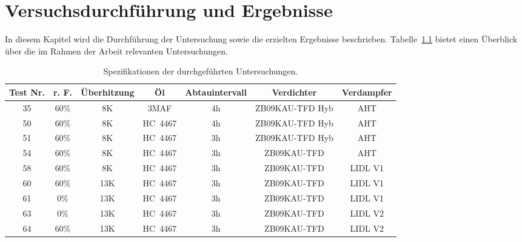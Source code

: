 
\chapter{Versuchsdurchführung und Ergebnisse}
\label{cha:Versuchsdurchführung}

In diesem Kapitel wird die Durchführung der Untersuchung sowie die erzielten Ergebnisse beschrieben. Tabelle~\ref{tab:alltests} bietet einen Überblick über die im Rahmen der Arbeit relevanten Untersuchungen.

\begin{table}[h!]
\centering
\caption{Spezifikationen der durchgeführten Untersuchungen.}
\label{tab:alltests}
\begin{tabular}{|ccccccc|}
\hline
Test Nr.              & r. F.                     & Überhitzung              & Öl                               & Abtauintervall          & Verdichter                           & Verdampfer \\ \hline
\multicolumn{1}{|c|}{35} & \multicolumn{1}{c|}{60\%} & \multicolumn{1}{c|}{8K}  & \multicolumn{1}{c|}{3MAF}        & \multicolumn{1}{c|}{4h} & \multicolumn{1}{c|}{ZB09KAU-TFD Hyb} & AHT        \\
\multicolumn{1}{|c|}{50} & \multicolumn{1}{c|}{60\%} & \multicolumn{1}{c|}{8K}  & \multicolumn{1}{c|}{HC~4467} & \multicolumn{1}{c|}{4h} & \multicolumn{1}{c|}{ZB09KAU-TFD Hyb} & AHT        \\
\multicolumn{1}{|c|}{51} & \multicolumn{1}{c|}{60\%} & \multicolumn{1}{c|}{8K}  & \multicolumn{1}{c|}{HC~4467} & \multicolumn{1}{c|}{3h} & \multicolumn{1}{c|}{ZB09KAU-TFD Hyb} & AHT        \\
\multicolumn{1}{|c|}{54} & \multicolumn{1}{c|}{60\%} & \multicolumn{1}{c|}{8K}  & \multicolumn{1}{c|}{HC~4467} & \multicolumn{1}{c|}{3h} & \multicolumn{1}{c|}{ZB09KAU-TFD}     & AHT        \\
\multicolumn{1}{|c|}{58} & \multicolumn{1}{c|}{60\%} & \multicolumn{1}{c|}{8K}  & \multicolumn{1}{c|}{HC~4467} & \multicolumn{1}{c|}{3h} & \multicolumn{1}{c|}{ZB09KAU-TFD}     & LIDL V1    \\
\multicolumn{1}{|c|}{60} & \multicolumn{1}{c|}{60\%} & \multicolumn{1}{c|}{13K} & \multicolumn{1}{c|}{HC~4467} & \multicolumn{1}{c|}{3h} & \multicolumn{1}{c|}{ZB09KAU-TFD}     & LIDL V1    \\
\multicolumn{1}{|c|}{61} & \multicolumn{1}{c|}{0\%}  & \multicolumn{1}{c|}{13K} & \multicolumn{1}{c|}{HC~4467} & \multicolumn{1}{c|}{3h} & \multicolumn{1}{c|}{ZB09KAU-TFD}     & LIDL V1    \\
\multicolumn{1}{|c|}{63} & \multicolumn{1}{c|}{0\%}  & \multicolumn{1}{c|}{13K} & \multicolumn{1}{c|}{HC~4467} & \multicolumn{1}{c|}{3h} & \multicolumn{1}{c|}{ZB09KAU-TFD}     & LIDL V2    \\
\multicolumn{1}{|c|}{64} & \multicolumn{1}{c|}{60\%} & \multicolumn{1}{c|}{13K} & \multicolumn{1}{c|}{HC~4467} & \multicolumn{1}{c|}{3h} & \multicolumn{1}{c|}{ZB09KAU-TFD}     & LIDL V2    \\ \hline
\end{tabular}
\end{table}
